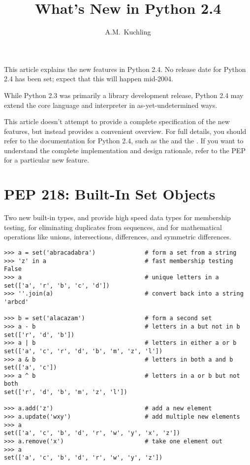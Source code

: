 \documentclass{howto}
\title{What's New in Python 2.4}
\author{A.M.\ Kuchling}
\begin{document}
\maketitle
\tableofcontents

This article explains the new features in Python 2.4.  No release date
for Python 2.4 has been set; expect that this will happen mid-2004.

While Python 2.3 was primarily a library development release, Python
2.4 may extend the core language and interpreter in
as-yet-undetermined ways.

This article doesn't attempt to provide a complete specification of
the new features, but instead provides a convenient overview.  For
full details, you should refer to the documentation for Python 2.4,
such as the  and
the .  
If you want to understand the complete implementation and design
rationale, refer to the PEP for a particular new feature.


\section{PEP 218: Built-In Set Objects}

Two new built-in types,  and
 provide high speed data types for
membership testing, for eliminating duplicates from sequences, and
for mathematical operations like unions, intersections, differences,
and symmetric differences.  

\begin{verbatim}
>>> a = set('abracadabra')              # form a set from a string
>>> 'z' in a                            # fast membership testing
False
>>> a                                   # unique letters in a
set(['a', 'r', 'b', 'c', 'd'])
>>> ''.join(a)                          # convert back into a string
'arbcd'

>>> b = set('alacazam')                 # form a second set
>>> a - b                               # letters in a but not in b
set(['r', 'd', 'b'])
>>> a | b                               # letters in either a or b
set(['a', 'c', 'r', 'd', 'b', 'm', 'z', 'l'])
>>> a & b                               # letters in both a and b
set(['a', 'c'])
>>> a ^ b                               # letters in a or b but not both
set(['r', 'd', 'b', 'm', 'z', 'l'])

>>> a.add('z')                          # add a new element
>>> a.update('wxy')                     # add multiple new elements
>>> a
set(['a', 'c', 'b', 'd', 'r', 'w', 'y', 'x', 'z'])       
>>> a.remove('x')                       # take one element out
>>> a
set(['a', 'c', 'b', 'd', 'r', 'w', 'y', 'z'])       
\end{verbatim}
\end{document}

